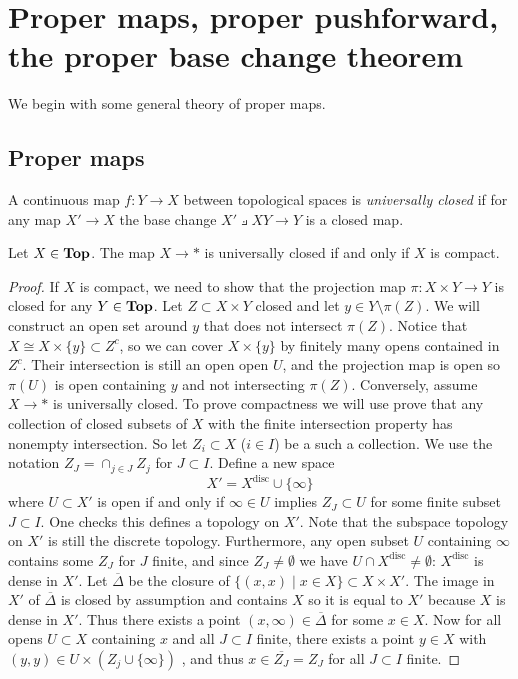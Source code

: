 \chapter{Proper maps, proper pushforward, the proper base change theorem}

We begin with some general theory of proper maps. 

\section{Proper maps}

\begin{defn}
	A continuous map $f: Y \to X$ between topological spaces is \emph{universally closed} if for any map $X' \to X$ the base change $X' \pullback{X} Y \to Y$ is a closed map.
\end{defn}

\begin{lem}
	Let $X \in \mathbf{Top}$. The map $X \to *$ is universally closed if and only if $X$ is compact. 
\end{lem}
\begin{proof}
	If $X$ is compact, we need to show that the projection map $\pi: X\times Y \to Y$ is closed for any $Y \in \mathbf{Top}$. Let $Z \subset X \times Y$ closed and let $y \in Y \setminus \pi(Z)$. We will construct an open set around $y$ that does not intersect $\pi(Z)$. 
	Notice that $X \cong X \times \{y\} \subset Z^{c}$, so we can cover $X \times \{y\}$ by finitely many opens contained in $Z^c$. Their intersection is still an open open $U$, and the projection map is open so $\pi(U)$ is open containing $y$ and not intersecting $\pi(Z)$. 
	Conversely, assume $X \to *$ is universally closed.
	To prove compactness we will use prove that any collection of closed subsets of $X$ with the finite intersection property has nonempty intersection. So let $Z_i \subset X$ ($i \in I$) be a such a collection. We use the notation $Z_J = \cap_{j \in J}Z_j$ for $J \subset I$.
	Define a new space \[
    	X' = X^{\text{disc}} \cup \{\infty\}
    \] where $U \subset X'$ is open if and only if $\infty \in U$ implies $Z_J \subset U$ for some finite subset $J \subset I$.
	One checks this defines a topology on $X'$. Note that the subspace topology on $X'$ is still the discrete topology. Furthermore, any open subset $U$ containing $\infty$ contains some $Z_J$ for $J$ finite, and since $Z_J \neq \emptyset$ we have $U \cap X^\text{disc} \neq \emptyset$: $X^{\text{disc}}$ is dense in $X'$. Let $\overline{\Delta}$ be the closure of $\{(x,x) \mid x \in X\} \subset X \times X'$. The image in $X'$ of $\overline{\Delta}$ is closed by assumption and contains $X$ so it is equal to $X'$ because $X$ is dense in $X'$. Thus there exists a point $(x, \infty) \in \overline{\Delta}$ for some $x \in X$. Now for all opens $U \subset X$ containing $x$ and all $J \subset I$ finite, there exists a point $y \in X$ with $(y, y) \in U \times (Z_j \cup \{\infty\})$ , and thus $x \in \overline{Z_J} = Z_J$ for all $J \subset I$ finite.
\end{proof}

